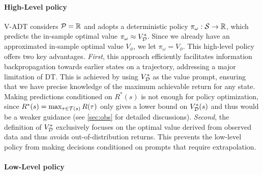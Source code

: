 \paragraph{{High-Level policy}} 
V-ADT considers ${\mathcal{P}} = \mathbb{R}$ and adopts a deterministic policy $\pi_\omega: {\mathcal{S}}\rightarrow \mathbb{R}$, which predicts the in-sample optimal value $\pi_\omega\approx V^*_{{\mathcal{D}}}$. Since we already have an approximated in-sample optimal value $V_\phi$, we let $\pi_\omega = V_\phi$. 
This high-level policy offers two key advantages. 
\emph{First}, this approach efficiently facilitates information backpropagation towards earlier states on a trajectory, 
addressing a major limitation of DT. This is achieved by using $V^*_{{\mathcal{D}}}$ as the value prompt, ensuring that we have precise knowledge of the maximum achievable return for any state.  
Making  predictions conditioned on $R^*(s)$ is not enough for policy optimization, since $R^*(s)=\max_{\tau\in{\mathcal{T}}(s)} R(\tau)$ only gives a lower bound on $V^*_{{\mathcal{D}}}(s)$ and thus would be a weaker guidance (see  \cref{sec:obs} for detailed discussions). 
\emph{Second}, the definition of $V^*_{{\mathcal{D}}}$ exclusively focuses on the optimal value derived from observed data and thus avoids out-of-distribution returns. This prevents the low-level policy from making decisions conditioned on prompts that require extrapolation. 

\paragraph{{Low-Level policy}} 

